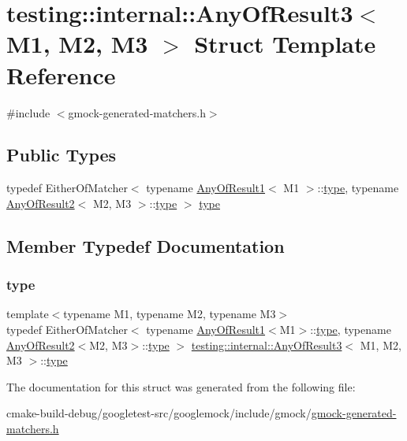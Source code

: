 \hypertarget{structtesting_1_1internal_1_1AnyOfResult3}{}\section{testing\+::internal\+::Any\+Of\+Result3$<$ M1, M2, M3 $>$ Struct Template Reference}
\label{structtesting_1_1internal_1_1AnyOfResult3}


{\ttfamily \#include $<$gmock-\/generated-\/matchers.\+h$>$}

\subsection*{Public Types}
\begin{DoxyCompactItemize}
\item 
typedef Either\+Of\+Matcher$<$ typename \mbox{\hyperlink{structtesting_1_1internal_1_1AnyOfResult1}{Any\+Of\+Result1}}$<$ M1 $>$\+::\mbox{\hyperlink{structtesting_1_1internal_1_1AnyOfResult3_a232b20553cc0a33a6741e85e19ef4b0c}{type}}, typename \mbox{\hyperlink{structtesting_1_1internal_1_1AnyOfResult2}{Any\+Of\+Result2}}$<$ M2, M3 $>$\+::\mbox{\hyperlink{structtesting_1_1internal_1_1AnyOfResult3_a232b20553cc0a33a6741e85e19ef4b0c}{type}} $>$ \mbox{\hyperlink{structtesting_1_1internal_1_1AnyOfResult3_a232b20553cc0a33a6741e85e19ef4b0c}{type}}
\end{DoxyCompactItemize}


\subsection{Member Typedef Documentation}
\mbox{\label{structtesting_1_1internal_1_1AnyOfResult3_a232b20553cc0a33a6741e85e19ef4b0c}} 
\subsubsection{\texorpdfstring{type}{type}}
{\footnotesize\ttfamily template$<$typename M1, typename M2, typename M3$>$ \\
typedef Either\+Of\+Matcher$<$ typename \mbox{\hyperlink{structtesting_1_1internal_1_1AnyOfResult1}{Any\+Of\+Result1}}$<$M1$>$\+::\mbox{\hyperlink{structtesting_1_1internal_1_1AnyOfResult3_a232b20553cc0a33a6741e85e19ef4b0c}{type}}, typename \mbox{\hyperlink{structtesting_1_1internal_1_1AnyOfResult2}{Any\+Of\+Result2}}$<$M2, M3$>$\+::\mbox{\hyperlink{structtesting_1_1internal_1_1AnyOfResult3_a232b20553cc0a33a6741e85e19ef4b0c}{type}} $>$ \mbox{\hyperlink{structtesting_1_1internal_1_1AnyOfResult3}{testing\+::internal\+::\+Any\+Of\+Result3}}$<$ M1, M2, M3 $>$\+::\mbox{\hyperlink{structtesting_1_1internal_1_1AnyOfResult3_a232b20553cc0a33a6741e85e19ef4b0c}{type}}}



The documentation for this struct was generated from the following file\+:\begin{DoxyCompactItemize}
\item 
cmake-\/build-\/debug/googletest-\/src/googlemock/include/gmock/\mbox{\hyperlink{gmock-generated-matchers_8h}{gmock-\/generated-\/matchers.\+h}}\end{DoxyCompactItemize}
